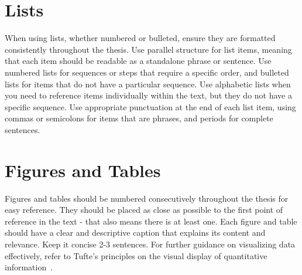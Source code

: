 \documentclass{../sharedAssets/tufte}
\begin{document}
\section{Lists}
When using lists, whether numbered or bulleted, ensure they are formatted consistently throughout the thesis.
Use parallel structure for list items, meaning that each item should be readable as a standalone phrase or sentence.
Use numbered lists for sequences or steps that require a specific order, and bulleted lists for items that do not have a particular sequence.
Use alphabetic lists when you need to reference items individually within the text, but they do not have a specific sequence.
Use appropriate punctuation at the end of each list item, using commas or semicolons for items that are phrases, and periods for complete sentences.


\section{Figures and Tables}

Figures and tables should be numbered consecutively throughout the thesis for easy reference. 
They should be placed as close as possible to the first point of reference in the text - that also means there is at least one.
Each figure and table should have a clear and descriptive caption that explains its content and relevance. Keep it concise 2-3 sentences.
For further guidance on visualizing data effectively, refer to Tufte's principles on the visual display of quantitative information~\cite{TufteVisuals2001}.
\end{document}
